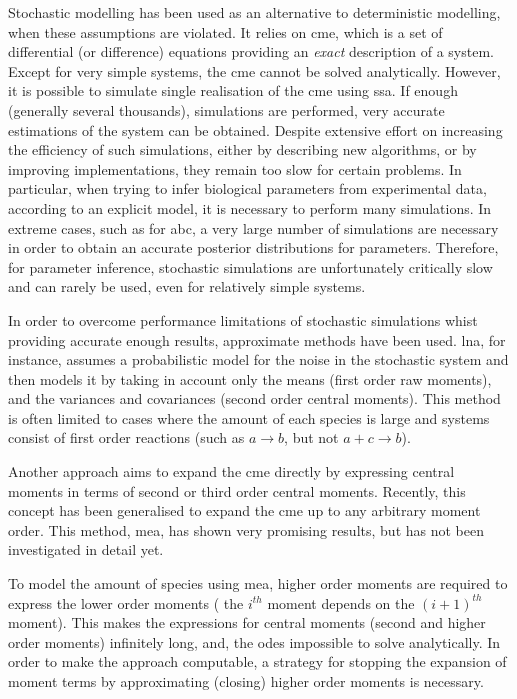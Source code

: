 Stochastic modelling has been used as an alternative to deterministic modelling, when these assumptions are violated.
It relies on \gls{cme}, which is a set of differential (or difference) equations providing an \emph{exact} description of a system\cite{kampen_stochastic_2011}.
Except for very simple systems, the \gls{cme} cannot be solved analytically.
However, it is possible to simulate single realisation of the \gls{cme} using \gls{ssa}.
If enough (generally several thousands), simulations are performed, very accurate estimations of the system can be obtained.
Despite extensive effort on increasing the efficiency of such simulations, either by describing new algorithms, or by improving implementations,
they remain too slow for certain problems.
In particular, when trying to infer biological parameters from experimental data, according to an explicit model,
it is necessary to perform many simulations.
In extreme cases, such as for \gls{abc}\cite{toni_approximate_2009}, a very large number of simulations are necessary in order to obtain an 
accurate posterior distributions for parameters.
Therefore, for parameter inference, stochastic simulations are unfortunately critically slow and can rarely be used, even for relatively simple systems.

In order to overcome performance limitations of stochastic simulations whist providing accurate enough results, approximate methods have been used.
\Acrlong{lna}, for instance, 
assumes a probabilistic model for the noise in the stochastic system and then models it by taking in account only the means (first order raw moments), and the variances and covariances (second order central moments)\cite{komorowski_bayesian_2009}.
This method is often limited to cases where the amount of each species is large and systems consist of first order reactions
(such as  $a \rightarrow b$, but not $a + c  \rightarrow b$)\cite{ale_general_2013}.

Another approach aims to expand the \gls{cme} directly by expressing central moments in terms of second or third order central moments\cite{gillespie_moment-closure_2009, gomez-uribe_mass_2007}.
Recently, this concept has been generalised to expand the \gls{cme} up to any arbitrary moment order\cite{ale_general_2013}.
This method, \gls{mea}, has shown very promising results, but has not been investigated in detail yet.

To model the amount of species using \gls{mea}, higher order moments are required to express the lower order moments
(\ie{} the $i^{th}$ moment depends on the $(i+1)^{th}$ moment).
This makes the expressions for central moments (second and higher order moments) infinitely long, and, the \glspl{ode} impossible to solve analytically. 
In order to make the approach computable, a strategy for stopping the
expansion of moment terms by approximating (closing) higher order moments is necessary.


